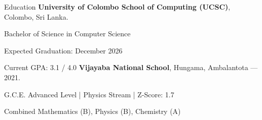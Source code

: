 \begin{rubric}{Education}
\entry*[]%
	\textbf{University of Colombo School of Computing (UCSC)}, Colombo, Sri Lanka.
	\par Bachelor of Science in Computer Science 
        \par Expected Graduation: December 2026
        \par Current GPA: 3.1 / 4.0
%
\entry*[]%
	\textbf{Vijayaba National School}, Hungama, Ambalantota — 2021.\par
	G.C.E. Advanced Level | Physics Stream | Z-Score: 1.7 
        \par Combined Mathematics (B), Physics (B), Chemistry (A)
\end{rubric}